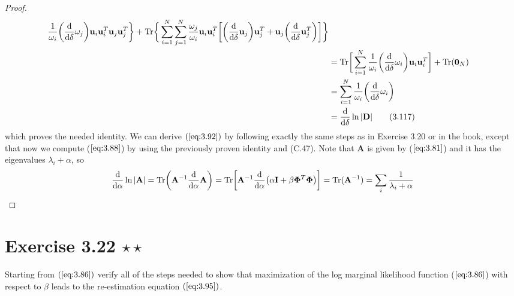\begin{proof}
\begin{align*}
            \frac{1}{\omega_i} \bigg(\dv{\delta}\omega_j\bigg) \mathbf{u}_i\mathbf{u}_i^T 
        \mathbf{u}_j\mathbf{u}_j^T \bigg\}
        + \text{Tr}\bigg\{\sum_{i=1}^{N} \sum_{j=1}^{N} 
            \frac{\omega_j}{\omega_i} \mathbf{u}_i\mathbf{u}_i^T
        \bigg[\bigg(\dv{\delta} \mathbf{u}_j\bigg)\mathbf{u}_j^T
        + \mathbf{u}_j\bigg(\dv{\delta}\mathbf{u}_j^T\bigg)\bigg]\bigg\} \\
        &= \text{Tr}\bigg[\sum_{i=1}^{N} \frac{1}{\omega_i}\bigg(\dv{\delta} \omega_i\bigg)
        \mathbf{u}_i\mathbf{u}_i^T\bigg] + \text{Tr}(\mathbf{0}_N) \\
        &= \sum_{i=1}^{N} \frac{1}{\omega_i} \bigg(\dv{\delta} \omega_i\bigg) \\
        &= \dv{\delta} \ln |\mathbf{D}| \tag{3.117}
    \end{align*}
    which proves the needed identity. We can derive $(\ref{eq:3.92})$ 
    by following exactly the same steps as in Exercise 3.20 or in the book,
    except that now we compute ($\ref{eq:3.88}$) by using the previously
    proven identity and (C.47). Note that $\mathbf{A}$ is given by ($\ref{eq:3.81}$)
    and it has the eigenvalues $\lambda_i + \alpha$, so
    \[
        \dv{\alpha}\ln |\mathbf{A}| 
        = \text{Tr}\bigg(\mathbf{A}^{-1}\dv{\alpha}\mathbf{A}\bigg)
        = \text{Tr}\bigg[\mathbf{A}^{-1}
        \dv{\alpha}(\alpha\mathbf{I} + \beta\mathbf{\Phi}^T\mathbf{\Phi})\bigg]
        = \text{Tr}(\mathbf{A}^{-1})
        = \sum_{i} \frac{1}{\lambda_i + \alpha} 
    \] 
\end{proof}

\section*{Exercise 3.22 $\star \star$}
Starting from $(\ref{eq:3.86})$ verify all of the steps needed
to show that maximization of the log marginal likelihood function
($\ref{eq:3.86}$) with respect to $\beta$ leads to the re-estimation
equation $(\ref{eq:3.95})$.

\vspace{1em}


